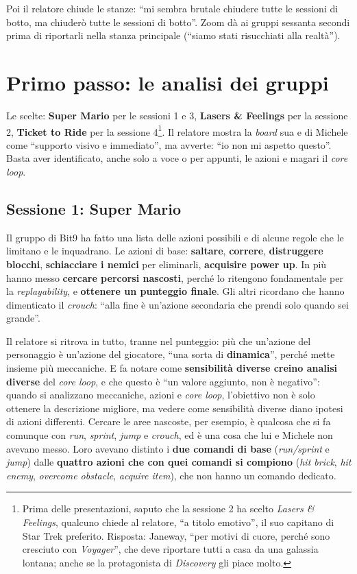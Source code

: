 Poi il relatore chiude le stanze: ``mi sembra brutale chiudere tutte le sessioni
di botto, ma chiuderò tutte le sessioni di botto''. Zoom dà ai gruppi sessanta
secondi prima di riportarli nella stanza principale (``siamo stati risucchiati
alla realtà'').

\section{Primo passo: le analisi dei gruppi}
\label{z7:sec:analisi-gruppi}

Le scelte: \textbf{Super Mario} per le sessioni 1 e 3, \textbf{Lasers \&
Feelings} per la sessione 2, \textbf{Ticket to Ride} per la sessione
4\footnote{Prima delle presentazioni, saputo che la sessione 2 ha scelto
\emph{Lasers \& Feelings}, qualcuno chiede al relatore, ``a titolo emotivo'',
il suo capitano di Star Trek preferito. Risposta: Janeway, ``per motivi di
cuore, perché sono cresciuto con \emph{Voyager}'', che deve riportare tutti a
casa da una galassia lontana; anche se la protagonista di \emph{Discovery} gli
piace molto.}. Il relatore mostra la \emph{board} sua e di Michele come
``supporto visivo e immediato'', ma avverte: ``io non mi aspetto questo''. Basta
aver identificato, anche solo a voce o per appunti, le azioni e magari il
\emph{core loop}.

\subsection{Sessione 1: Super Mario}

Il gruppo di Bit9 ha fatto una lista delle azioni possibili e di alcune regole
che le limitano e le inquadrano. Le azioni di base: \textbf{saltare},
\textbf{correre}, \textbf{distruggere blocchi}, \textbf{schiacciare i nemici} per
eliminarli, \textbf{acquisire power up}. In più hanno messo \textbf{cercare
percorsi nascosti}, perché lo ritengono fondamentale per la
\emph{replayability}, e \textbf{ottenere un punteggio finale}. Gli altri ricordano
che hanno dimenticato il \emph{crouch}: ``alla fine è un'azione secondaria che
prendi solo quando sei grande''.

Il relatore si ritrova in tutto, tranne nel punteggio: più che un'azione del
personaggio è un'azione del giocatore, ``una sorta di \textbf{dinamica}'', perché
mette insieme più meccaniche. E fa notare come \textbf{sensibilità diverse creino
analisi diverse} del \emph{core loop}, e che questo è ``un valore aggiunto, non è
negativo'': quando si analizzano meccaniche, azioni e \emph{core loop},
l'obiettivo non è solo ottenere la descrizione migliore, ma vedere come
sensibilità diverse diano ipotesi di azioni differenti. Cercare le aree nascoste,
per esempio, è qualcosa che si fa comunque con \emph{run}, \emph{sprint},
\emph{jump} e \emph{crouch}, ed è una cosa che lui e Michele non avevano messo.
Loro avevano distinto i \textbf{due comandi di base} (\emph{run/sprint} e
\emph{jump}) dalle \textbf{quattro azioni che con quei comandi si compiono}
(\emph{hit brick}, \emph{hit enemy}, \emph{overcome obstacle}, \emph{acquire
item}), che non hanno un comando dedicato.

